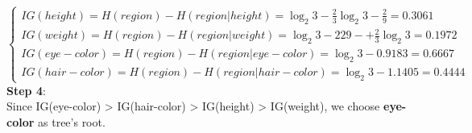 \documentclass[onecolumn,oneside]{SUSTechHomework}
\begin{document}
    \[
        \begin{cases}
            IG(height) = H(region) - H(region|height) = \log_2 3 - \frac{2}{3} \log_2 3 - \frac{2}{9} = 0.3061 \\
            IG(weight) = H(region) - H(region|weight) = \log_2 3 - {22}{9} -+\frac{2}{3} \log_2 3 = 0.1972\\
            IG(eye-color) = H(region) - H(region|eye-color) = \log_2 3 - 0.9183 = 0.6667\\
            IG(hair-color) = H(region) - H(region|hair-color) = \log_2 3 - 1.1405 = 0.4444
        \end{cases}
    \]
    \textbf{Step 4}:\\
    Since IG(eye-color) > IG(hair-color) > IG(height) > IG(weight), we choose \textbf{eye-color} as tree's root.
\end{document}
